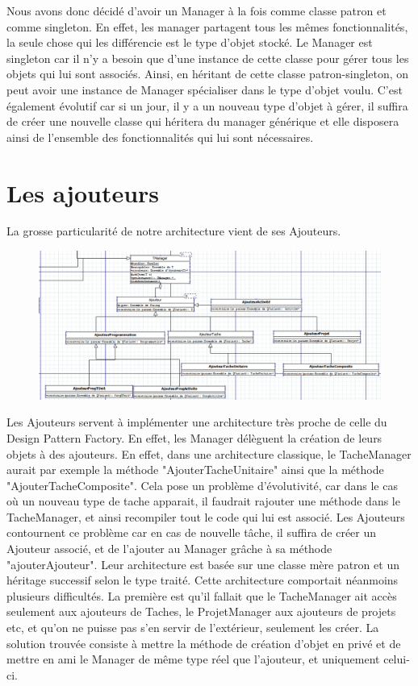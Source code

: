 Nous avons donc décidé d’avoir un Manager à la fois comme classe patron et comme singleton. En effet, les manager partagent tous les mêmes fonctionnalités, la seule chose qui les différencie est le type d’objet stocké. Le Manager est singleton car il n’y a besoin que d’une instance de cette classe pour gérer tous les objets qui lui sont associés. Ainsi, en héritant de cette classe patron-singleton, on peut avoir une instance de Manager spécialiser dans le type d’objet voulu. C’est également évolutif car si un jour, il y a un nouveau type d’objet à gérer, il suffira de créer une nouvelle classe qui héritera du manager générique et elle disposera ainsi de l’ensemble des fonctionnalités qui lui sont nécessaires.

\section{Les ajouteurs}
La grosse particularité de notre architecture vient de ses Ajouteurs.
\begin{figure}[h]
	\includegraphics[scale=0.4]{ressources/figure4.png}
\end{figure}
Les Ajouteurs servent à implémenter une architecture très proche de celle du Design Pattern Factory. En effet, les Manager délèguent la création de leurs objets à des ajouteurs. En effet, dans une architecture classique, le TacheManager aurait par exemple la méthode "AjouterTacheUnitaire" ainsi que la méthode "AjouterTacheComposite". Cela pose un problème d’évolutivité, car dans le cas où un nouveau type de tache apparait, il faudrait rajouter une méthode dans le TacheManager, et ainsi recompiler tout le code qui lui est associé. Les Ajouteurs contournent ce problème car en cas de nouvelle tâche, il suffira de créer un Ajouteur associé, et de l’ajouter au Manager grâche à sa méthode "ajouterAjouteur". Leur architecture est basée sur une classe mère patron et un héritage successif selon le type traité.
Cette architecture comportait néanmoins plusieurs difficultés. La première est qu’il fallait que le TacheManager ait accès seulement aux ajouteurs de Taches, le ProjetManager aux ajouteurs de projets etc, et qu’on ne puisse pas s’en servir de l’extérieur, seulement les créer. La solution trouvée consiste à mettre la méthode de création d’objet en privé et de mettre en ami le Manager de même type réel que l’ajouteur, et uniquement celui-ci.
